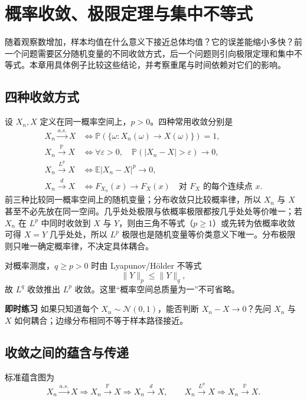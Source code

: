 \chapter{概率收敛、极限定理与集中不等式}
\label{ch:limit-theorems}


随着观察数增加，样本均值在什么意义下接近总体均值？它的误差能缩小多快？前一个问题需要区分随机变量的不同收敛方式，后一个问题则引向极限定理和集中不等式。本章用具体例子比较这些结论，并考察重尾与时间依赖对它们的影响。

\section{四种收敛方式}

设 $X_n,X$ 定义在同一概率空间上，$p>0$。四种常用收敛分别是
\begin{align*}
 X_n\xrightarrow{a.s.}X
 &\iff \mathbb P\!\left(\{\omega:X_n(\omega)\to X(\omega)\}\right)=1,\\
 X_n\xrightarrow{\mathbb P}X
 &\iff \forall\varepsilon>0,\quad
 \mathbb P(|X_n-X|>\varepsilon)\to0,\\
 X_n\xrightarrow{L^p}X
 &\iff \mathbb E|X_n-X|^p\to0,\\
 X_n\xrightarrow d X
 &\iff F_{X_n}(x)\to F_X(x)
 \quad\text{对 $F_X$ 的每个连续点 $x$}.
\end{align*}
前三种比较同一概率空间上的随机变量；分布收敛只比较概率律，所以 $X_n$ 与 $X$ 甚至不必先放在同一空间。几乎处处极限与依概率极限都按几乎处处等价唯一；若 $X_n$ 在 $L^p$ 中同时收敛到 $X$ 与 $Y$，则由三角不等式（$p\ge1$）或先转为依概率收敛可得 $X=Y$ 几乎处处，所以 $L^p$ 极限也是随机变量等价类意义下唯一。分布极限则只唯一确定概率律，不决定具体耦合。

对概率测度，$q\ge p>0$ 时由 Lyapunov/Hölder 不等式
\[
 \|Y\|_p\le \|Y\|_q,
\]
故 $L^q$ 收敛推出 $L^p$ 收敛。这里“概率空间总质量为一”不可省略。

\noindent\textbf{即时练习}\quad
如果只知道每个 $X_n\sim\mathcal N(0,1)$，能否判断 $X_n-X\to0$？先问 $X_n$ 与 $X$ 如何耦合；边缘分布相同不等于样本路径接近。

\section{收敛之间的蕴含与传递}

标准蕴含图为
\[
 X_n\xrightarrow{a.s.}X\Longrightarrow X_n\xrightarrow{\mathbb P}X
 \Longrightarrow X_n\xrightarrow dX,
 \qquad
 X_n\xrightarrow{L^p}X\Longrightarrow X_n\xrightarrow{\mathbb P}X.
\]

